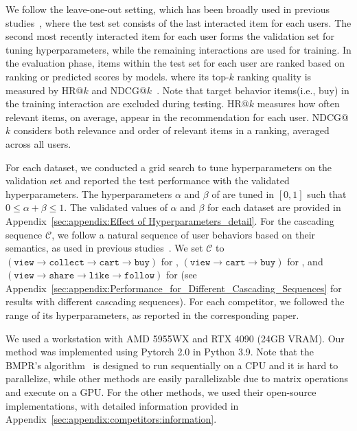 We follow the leave-one-out setting, which has been broadly used in previous studies~\cite{MengZGGLZZTLZ23,LeeLKSJ24xxaw,ChengCHLZGP23fqvn}, where the test set consists of the last interacted item for each users. 
The second most recently interacted item for each user forms the validation set for tuning hyperparameters, while the remaining interactions are used for training.
%
In the evaluation phase, items within the test set for each user are ranked based on ranking or predicted scores by models. where its top-$k$ ranking quality is measured by HR@$k$ and NDCG@$k$~\cite{MengZGGLZZTLZ23,LeeLKSJ24xxaw,ChengCHLZGP23fqvn,ZhangBCSYGWHH24}. Note that target behavior items(i.e., buy) in the training interaction are excluded during testing.
HR@$k$ measures how often relevant items, on average, appear in the recommendation for each user.
NDCG@$k$ considers both relevance and order of relevant items in a ranking, averaged across all users.

For each dataset, we conducted a grid search to tune hyperparameters on the validation set and reported the test performance with the validated hyperparameters. 
The hyperparameters $\alpha$ and $\beta$ of \method are tuned in $[0,1]$ such that $0 \leq \alpha + \beta \leq 1$.
The validated values of $\alpha$ and $\beta$ for each dataset are provided in Appendix~\ref{sec:appendix:Effect of Hyperparameters_detail}.
For the cascading sequence $\mathcal{C}$, we follow a natural sequence of user behaviors based on their semantics, as used in previous studies~\cite{yin2024hecgcn, MengMZYZL23, LiuXWY00024, YanCGSLSL24, ChengCHLZGP23fqvn}.
We set $\mathcal{C}$ to $(\texttt{view}\rightarrow\texttt{collect}\rightarrow\texttt{cart}\rightarrow\texttt{buy})$ for \tmall, $(\texttt{view}\rightarrow\texttt{cart}\rightarrow\texttt{buy})$ for \taobao, and $(\texttt{view}\rightarrow\texttt{share}\rightarrow\texttt{like}\rightarrow\texttt{follow})$ for \tenrec (see Appendix~\ref{sec:appendix:Performance_for_Different_Cascading_Sequences} for results with different cascading sequences).
For each competitor, we followed the range of its hyperparameters, as reported in the corresponding paper.

We used a workstation with AMD 5955WX and RTX 4090 (24GB VRAM).
Our method \method was implemented using Pytorch 2.0 in Python 3.9. 
Note that the BMPR's algorithm~\cite{LiLCYLLD24} is designed to run sequentially on a CPU and it is hard to parallelize, while other methods are easily parallelizable due to matrix operations and execute on a GPU.
For the other methods, we used their open-source implementations, with detailed information provided in Appendix~\ref{sec:appendix:competitors:information}.


